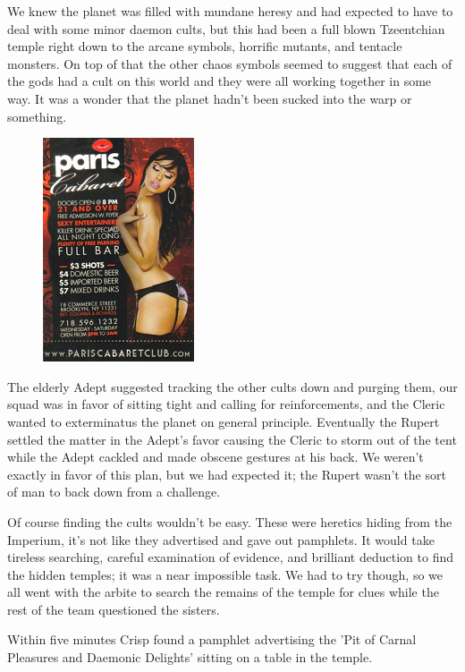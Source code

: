 We knew the planet was filled with mundane heresy and had expected to have to deal with some minor daemon cults, but this had been a full blown Tzeentchian temple right down to the arcane symbols, horrific mutants, and tentacle monsters. 
On top of that the other chaos symbols seemed to suggest that each of the gods had a cult on this world and they were all working together in some way. 
It was a wonder that the planet hadn't been sucked into the warp or something.

\begin{figure}
	\begin{center}
		\includegraphics[width=\figwidth]{pics/6/12.png}
	\end{center}
\end{figure}
The elderly Adept suggested tracking the other cults down and purging them, our squad was in favor of sitting tight and calling for reinforcements, and the Cleric wanted to exterminatus the planet on general principle. 
Eventually the Rupert settled the matter in the Adept's favor causing the Cleric to storm out of the tent while the Adept cackled and made obscene gestures at his back. 
We weren't exactly in favor of this plan, but we had expected it; the Rupert wasn't the sort of man to back down from a challenge.

Of course finding the cults wouldn't be easy. 
These were heretics hiding from the Imperium, it's not like they advertised and gave out pamphlets. 
It would take tireless searching, careful examination of evidence, and brilliant deduction to find the hidden temples; it was a near impossible task. 
We had to try though, so we all went with the arbite to search the remains of the temple for clues while the rest of the team questioned the sisters.

Within five minutes Crisp found a pamphlet advertising the 'Pit of Carnal Pleasures and Daemonic Delights' sitting on a table in the temple.

